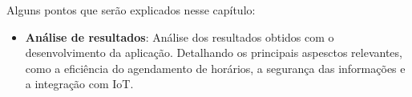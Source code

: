 Alguns pontos que serão explicados nesse capítulo:

\begin{itemize}
	\item \textbf{Análise de resultados}: Análise dos resultados obtidos com o desenvolvimento da aplicação. Detalhando os principais aspesctos relevantes, como a eficiência do agendamento de horários, a segurança das informações e a integração com IoT.
\end{itemize}